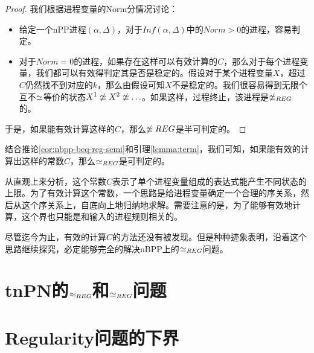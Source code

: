 \begin{proof}
我们根据进程变量的Norm分情况讨论：
\begin{itemize}
\item 给定一个nPP进程$(\alpha,\Delta)$，对于$Inf(\alpha,\Delta)$中的$Norm>0$的进程，容易判定。
\item 对于$Norm=0$的进程，如果存在这样可以有效计算的$C$，那么对于每个进程变量，我们都可以有效得判定其是否是稳定的。假设对于某个进程变量$X$，超过$C$仍然找不到对应的$k$，那么由假设可知$X$不是稳定的。我们很容易得到无限个互不$\simeq$等价的状态$X^1\not\simeq X^2\not\simeq\ldots$。如果这样，过程终止，该进程是$\not\simeq_{REG}$的。
\end{itemize}
于是，如果能有效计算这样的$C$，那么$\not\simeq{REG}$是半可判定的。
\end{proof}

结合推论\ref{cor:nbpp-beq-reg-semi}和引理\ref{lemma:term}，我们可知，如果能有效的计算出这样的常数$C$，那么$\simeq_{REG}$是可判定的。

从直观上来分析，这个常数$C$表示了单个进程变量组成的表达式能产生不同状态的上限。为了有效计算这个常数，一个思路是给进程变量确定一个合理的序关系，然后从这个序关系上，自底向上地归纳地求解。需要注意的是，为了能够有效地计算，这个界也只能是和输入的进程规则相关的。

尽管迄今为止，有效的计算$C$的方法还没有被发现。但是种种迹象表明，沿着这个思路继续探究，必定能够完全的解决nBPP上的$\simeq_{REG}$问题。

\section{tnPN的$\approx_{REG}$和$\simeq_{REG}$问题}
\label{sec:tnPN}

\section{Regularity问题的下界}
\label{sec:lower-bound}



